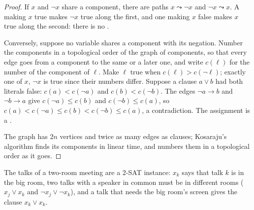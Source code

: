 \begin{proof}
If $x$ and $\neg x$ share a component, there are paths $x \leadsto \neg x$ and $\neg x \leadsto x$. A  making $x$
true makes $\neg x$ true along the first, and one making $x$ false makes $x$ true along the second: there is no .

Conversely, suppose no variable shares a component with its negation. Number the components in a topological order of
the graph of components, so that every edge goes from a component to the same or a later one, and write $c(\ell)$ for
the number of the component of $\ell$. Make $\ell$ true when $c(\ell) > c(\neg \ell)$; exactly one of $x$, $\neg x$ is
true since their numbers differ. Suppose a clause $a \vee b$ had both literals false: $c(a) < c(\neg a)$ and $c(b) <
c(\neg b)$. The edges $\neg a \to b$ and $\neg b \to a$ give $c(\neg a) \leq c(b)$ and $c(\neg b) \leq c(a)$, so $c(a) <
c(\neg a) \leq c(b) < c(\neg b) \leq c(a)$, a contradiction. The assignment is a .

The graph has $2n$ vertices and twice as many edges as clauses; Kosaraju's algorithm finds its components in linear
time, and numbers them in a topological order as it goes.
\end{proof}

\label{lst:b2:predicate-logic:twosat}

\label{lst:b2:predicate-logic:twosat-model}

The talks of a two-room meeting are a 2-SAT instance: $x_k$ says that talk $k$ is in the big room, two talks with a
speaker in common must be in different rooms ($x_j \vee x_k$ and $\neg x_j \vee \neg x_k$), and a talk that needs the
big room's screen gives the clause $x_k \vee x_k$.

\label{out:b2:predicate-logic:twosat}

